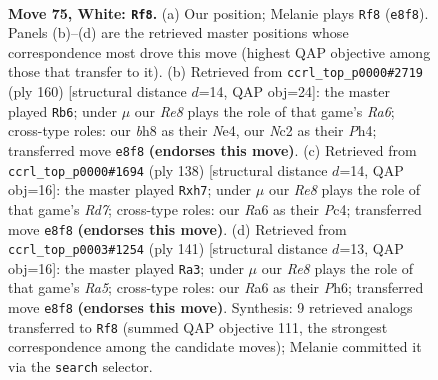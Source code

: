\documentclass[11pt]{article}
\begin{document}
\clearpage

\begin{figure}[p]\centering
\begin{subfigure}{0.46\textwidth}\centering
\resizebox{\linewidth}{!}{%
\newchessgame
\chessboard[
  setfen={4R2b/1r5k/R7/8/2P5/8/2N3K1/8 w - - 70 75},
  showmover=false,
  pgfstyle=straightmove, color=movearrow, markmove={e8-f8}
]}
\caption{}
\end{subfigure}\hfill
\begin{subfigure}{0.46\textwidth}\centering
\resizebox{\linewidth}{!}{%
\newchessgame
\chessboard[
  setfen={8/5k2/R3b3/8/4NK1P/8/8/4r3 w - - 47 81},
  showmover=false,
  pgfstyle=straightmove, color=movearrow, markmove={a6-b6}
]}
\caption{}
\end{subfigure}
\\[4pt]
\begin{subfigure}{0.46\textwidth}\centering
\resizebox{\linewidth}{!}{%
\newchessgame
\chessboard[
  setfen={8/3R3b/5k2/8/2P2r2/8/4K3/8 w - - 2 70},
  showmover=false,
  pgfstyle=straightmove, color=movearrow, markmove={d7-h7}
]}
\caption{}
\end{subfigure}\hfill
\begin{subfigure}{0.46\textwidth}\centering
\resizebox{\linewidth}{!}{%
\newchessgame
\chessboard[
  setfen={8/8/7p/8/r3BK1k/8/5R2/8 b - - 17 71},
  showmover=false,
  pgfstyle=straightmove, color=movearrow, markmove={a4-a3}
]}
\caption{}
\end{subfigure}
\caption{\textbf{Move 75, White: \texttt{Rf8}.} (a) Our position; Melanie plays \texttt{Rf8} (\texttt{e8f8}). Panels (b)--(d) are the retrieved master positions whose correspondence most drove this move (highest QAP objective among those that transfer to it). (b) Retrieved from \texttt{ccrl\_top\_p0000\#2719} (ply 160) [structural distance $d$=14, QAP obj=24]: the master played \texttt{Rb6}; under $\mu$ our \emph{Re8} plays the role of that game's \emph{Ra6}; cross-type roles: our \emph{b}h8 as their \emph{N}e4, our \emph{N}c2 as their \emph{P}h4; transferred move \texttt{e8f8} \textbf{(endorses this move)}. (c) Retrieved from \texttt{ccrl\_top\_p0000\#1694} (ply 138) [structural distance $d$=14, QAP obj=16]: the master played \texttt{Rxh7}; under $\mu$ our \emph{Re8} plays the role of that game's \emph{Rd7}; cross-type roles: our \emph{R}a6 as their \emph{P}c4; transferred move \texttt{e8f8} \textbf{(endorses this move)}. (d) Retrieved from \texttt{ccrl\_top\_p0003\#1254} (ply 141) [structural distance $d$=13, QAP obj=16]: the master played \texttt{Ra3}; under $\mu$ our \emph{Re8} plays the role of that game's \emph{Ra5}; cross-type roles: our \emph{R}a6 as their \emph{P}h6; transferred move \texttt{e8f8} \textbf{(endorses this move)}. Synthesis: 9 retrieved analogs transferred to \texttt{Rf8} (summed QAP objective 111, the strongest correspondence among the candidate moves); Melanie committed it via the \texttt{search} selector.}
\label{fig:thought-m148}
\end{figure}
\end{document}
